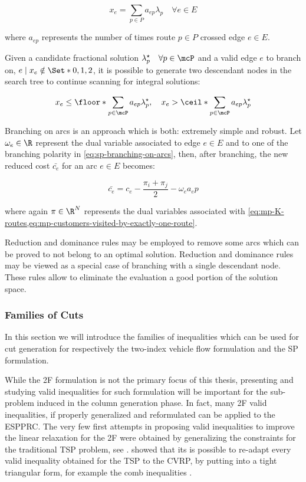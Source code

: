 \begin{equation}
	x_e = \sum_{p \in P} a_{ep} \lambda_p  \quad \forall e \in E
\end{equation}

where $a_{ep}$ represents the number of times route $p \in P$ crossed edge $e \in E$.

Given a candidate fractional solution $\lambda^\star_p \quad \forall p \in \mcP$
and a valid edge $e$ to branch on, $e \mid x_e \notin \Set*{0, 1, 2}$,
it is possible to generate two descendant nodes in the search tree
to continue scanning for integral solutions:

\begin{equation}\label{eq:sp-branching-on-arcs}
	x_e \le \floor*{\sum_{p \in \mcP} a_{ep} \lambda^\star_p}, \quad
	x_e > \ceil*{\sum_{p \in \mcP} a_{ep} \lambda^\star_p}
\end{equation}

Branching on arcs is an approach which is both: extremely simple and robust.
Let $\omega_e \in \R$ represent the dual variable associated to
edge $e \in E$ and to
one of the branching polarity in \cref{eq:sp-branching-on-arcs},
then, after branching,
the new reduced cost $\bar{c_e}$ for an arc $e \in E$ becomes:

\begin{equation}
	\bar{c_e} = c_e - \frac{\pi_i + \pi_j}{2} - \omega_e a_ep
\end{equation}

where again $\pi \in \R^N$ represents the dual variables associated with \cref{eq:mp-K-routes,eq:mp-customers-visited-by-exactly-one-route}.

Reduction and dominance rules may be employed to remove some arcs
which can be proved to not belong to an optimal solution.
Reduction and dominance rules may be viewed as a special case of branching
with a single descendant node.
These rules allow to eliminate the evaluation
a good portion of the solution space.


\subsubsection{Families of Cuts}
\label{sec:families-of-cuts}

In this section we will introduce the families of inequalities
which can be used for cut generation for respectively
the two-index vehicle flow formulation
and the SP formulation.


While the 2F formulation is not the primary focus of this thesis,
presenting and studying valid inequalities for such formulation
will be important for the sub-problem induced in the column generation phase.
In fact, many 2F valid inequalities, if properly generalized and reformulated
can be applied to the ESPPRC.
The very few first attempts in proposing valid inequalities
to improve the linear relaxation for the 2F were obtained by
generalizing the constraints for the traditional TSP problem, see \textcite{naddef1993}.
\citeauthor{naddef1993} showed that its is possible to re-adapt
every valid inequality obtained for the TSP to the CVRP,
by putting into a tight triangular form,
for example the comb inequalities \parencite{chvatal1973,grotschel1979,augerat1995a}.

